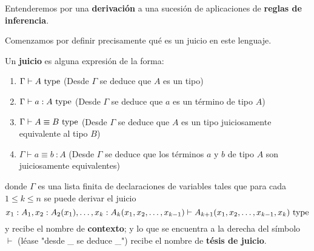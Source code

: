 \documentclass{article}
\begin{document}
        Entenderemos por una \textbf{derivación} a una sucesión de aplicaciones de \textbf{reglas de inferencia}.

        Comenzamos por definir precisamente qué es un juicio en este lenguaje.

        \begin{definition}[Juicios]
            Un \textbf{juicio} es alguna expresión de la forma:
            \begin{enumerate}
                \item $\Gamma \vdash A\ \mathrm{type}$ (Desde $\Gamma$ se deduce que $A$ es un tipo)
                \item $\Gamma \vdash a : A\ \mathrm{type}$ (Desde $\Gamma$ se deduce que $a$ es un término de tipo $A$)
                \item $\Gamma \vdash A \equiv B\ \type$ (Desde $\Gamma$ se deduce que $A$ es un tipo juiciosamente equivalente al tipo $B$)
                \item $\Gamma \vdash a \equiv b\ : A$ (Desde $\Gamma$ se deduce que los términos $a$ y $b$ de tipo $A$ son juiciosamente equivalentes)
            \end{enumerate}

            donde $\Gamma$ es una lista finita de declaraciones de variables tales que para cada $1 \leq k \leq n$
            se puede derivar el juicio
            $$
                x_1 : A_1, x_2 : A_2(x_1), \dots, x_k : A_k(x_1, x_2, \dots, x_{k-1}) \vdash A_{k+1}(x_1, x_2, \dots, x_{k-1}, x_k)\ \mathrm{type}
            $$
            y recibe el nombre de \textbf{contexto}; y lo que se encuentra a la derecha del símbolo $\vdash$ 
            (léase "desde \_ se deduce \_") recibe el nombre de \textbf{tésis de juicio}.
        \end{definition}
\end{document}

